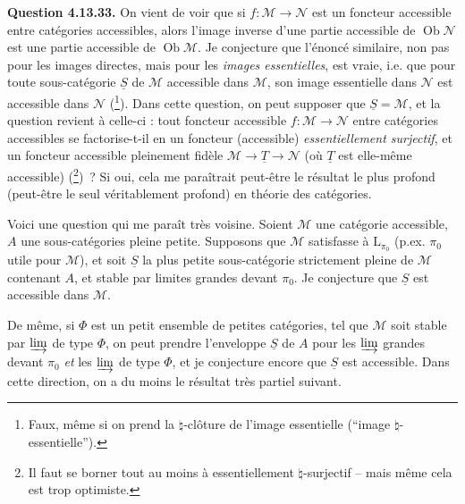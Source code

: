 \documentclass[11pt]{article}
\newcommand{\printedpage}[1]{\marginpar{\footnotesize p.~#1}}
\newcommand{\msp}[1]{\marginpar{\footnotesize [#1]}}
\newcommand{\Ob}{\operatorname{Ob}}
\newcommand{\limind}{\varinjlim}
\begin{document}
\textbf{Question 4.13.33.} On vient de voir que si $f : \mathcal{M} \longrightarrow \mathcal{N}$ est un foncteur accessible entre catégories accessibles, alors l'image inverse d'une partie accessible de $\Ob \mathcal{N}$ est une partie accessible de $\Ob \mathcal{M}$. Je conjecture que l'énoncé similaire, non pas pour les images directes, mais pour les \textit{images essentielles}, est
\msp{page 354}
vraie, i.e. que pour toute sous-catégorie $\underline{S}$ de $\mathcal{M}$ accessible dans $\mathcal{M}$, son image essentielle dans $\mathcal{N}$ est accessible dans $\mathcal{N}$ (\footnote[156]{Faux, même si on prend la $\natural$-clôture de l'image essentielle (“image $\natural$-essentielle”).}). Dans cette question, on peut supposer que $\underline{S} = \mathcal{M}$, et la question revient à celle-ci : tout foncteur accessible $f : \mathcal{M} \longrightarrow \mathcal{N}$ entre catégories accessibles se factorise-t-il en un foncteur (accessible) \textit{essentiellement surjectif}, et un foncteur accessible pleinement fidèle $\mathcal{M} \longrightarrow \underline{T} \longrightarrow \mathcal{N}$ (où $\underline{T}$ est elle-même accessible) (\footnote[157]{Il faut se borner tout au moins à essentiellement $\natural$-surjectif – mais même cela est trop optimiste.})~? Si oui, cela me paraîtrait peut-être le résultat le plus profond (peut-être le seul véritablement profond) en théorie des catégories. %

Voici une question qui me paraît très voisine. Soient $\mathcal{M}$ une catégorie accessible, $A$ une sous-catégories pleine petite. Supposons que $\mathcal{M}$ satisfasse à $\mathrm{L}_{\pi_0}$ (p.ex. $\pi_0$ utile pour $\mathcal{M}$), et soit $\underline{S}$ la plus petite sous-catégorie strictement pleine de $\mathcal{M}$ contenant $A$, et stable par limites grandes devant $\pi_0$. Je conjecture que $\underline{S}$ est accessible dans $\mathcal{M}$. %

\msp{page 355}

De même, si $\Phi$ est un petit ensemble de petites catégories, tel que $\mathcal{M}$ soit stable par $\limind$ de type $\Phi$, on peut prendre l'enveloppe $\underline{S}$ de $A$ pour les $\limind$ grandes devant $\pi_0$ \textit{et} les
\printedpage{135}
$\limind$ de type $\Phi$, et je conjecture encore que $\underline{S}$ est accessible. Dans cette direction, on a du moins le résultat très partiel suivant.
\end{document}
